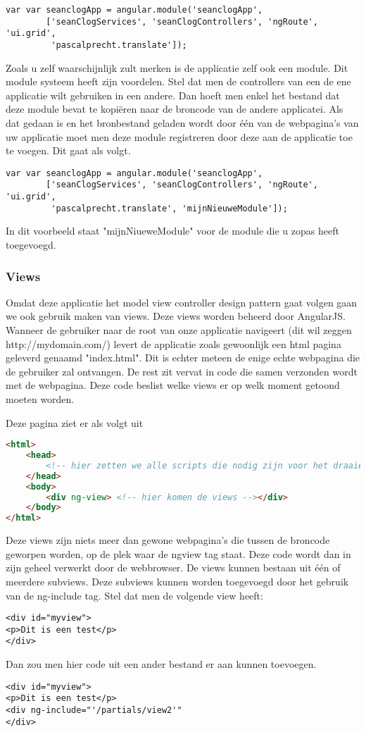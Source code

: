 \documentclass[a4paper,11pt]{article}
\begin{document}
\begin{verbatim}
var var seanclogApp = angular.module('seanclogApp',
		['seanClogServices', 'seanClogControllers', 'ngRoute', 'ui.grid',
		 'pascalprecht.translate']);
\end{verbatim}

Zoals u zelf waarschijnlijk zult merken is de applicatie zelf ook een module. Dit module systeem heeft zijn voordelen. Stel dat men de controllers van een de ene applicatie wilt gebruiken in een andere. Dan hoeft men enkel het bestand dat deze module bevat te kopiëren naar de broncode van de andere applicatei. Als dat gedaan is en het bronbestand geladen wordt door één van de webpagina's van uw applicatie moet men deze module registreren door deze aan de applicatie toe te voegen. Dit gaat als volgt.

\begin{verbatim}
var var seanclogApp = angular.module('seanclogApp',
		['seanClogServices', 'seanClogControllers', 'ngRoute', 'ui.grid',
		 'pascalprecht.translate', 'mijnNieuweModule']);
\end{verbatim}

In dit voorbeeld staat "mijnNiueweModule" voor de module die u zopas heeft toegevoegd.

\subsubsection{Views}
Omdat deze applicatie het model view controller design pattern gaat volgen gaan we ook gebruik maken van views. Deze views worden beheerd door AngularJS. Wanneer de gebruiker naar de root van onze applicatie navigeert (dit wil zeggen http://mydomain.com/) levert de applicatie zoals gewoonlijk een html pagina geleverd genaamd "index.html". Dit is echter meteen de enige echte webpagina die de gebruiker zal ontvangen. De rest zit vervat in code die samen verzonden wordt met de webpagina. Deze code beslist welke views er op welk moment getoond moeten worden.

Deze pagina ziet er als volgt uit
\begin{lstlisting}[language=html]
<html>
	<head>
		<!-- hier zetten we alle scripts die nodig zijn voor het draaien van de applicatie -->
	</head>
	<body>
		<div ng-view> <!-- hier komen de views --></div>
	</body>
</html>
\end{lstlisting}
Deze views zijn niets meer dan gewone webpagina's die tussen de broncode geworpen worden, op de plek waar de ngview tag staat. Deze code wordt dan in zijn geheel verwerkt door de webbrowser. De views kunnen bestaan uit één of meerdere subviews. Deze subviews kunnen worden toegevoegd door het gebruik van de ng-include tag. Stel dat men de volgende view heeft:
\begin{verbatim}
<div id="myview">
<p>Dit is een test</p>
</div>
\end{verbatim}
Dan zou men hier code uit een ander bestand er aan kunnen toevoegen.
\begin{verbatim}
<div id="myview">
<p>Dit is een test</p>
<div ng-include="'/partials/view2'"
</div>
\end{verbatim}
\end{document}
